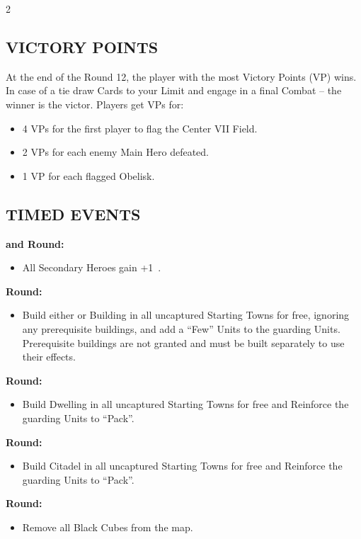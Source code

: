 \begin{multicols}{2}
\subsection*{\MakeUppercase{Victory Points}}
At the end of the Round 12, the player with the most Victory Points (VP) wins. In case of a tie draw Cards to your  Limit and engage in a final Combat -- the winner is the victor. Players get VPs for:

\begin{itemize}
  \item 4 VPs for the first player to flag the Center VII Field.
  \item 2 VPs for each enemy Main Hero defeated.
  \item 1 VP for each flagged Obelisk.
\end{itemize}

\subsection*{\MakeUppercase{Timed Events}}
\textbf{ and  Round:}
\begin{itemize}
  \item All Secondary Heroes gain +1~.
\end{itemize}
\textbf{ Round:}
\begin{itemize}
  \item Build either  or  Building in all uncaptured Starting Towns for free, ignoring any
prerequisite buildings, and add a ``Few''  Units to the guarding Units. Prerequisite buildings are not granted and must be built
separately to use their effects.
\end{itemize}
\textbf{ Round:}
\begin{itemize}
  \item Build  Dwelling in all uncaptured Starting Towns for free and Reinforce the guarding  Units to ``Pack''.
\end{itemize}
\textbf{ Round:}
\begin{itemize}
  \item Build Citadel in all uncaptured Starting Towns for free and Reinforce the guarding  Units to ``Pack''.
\end{itemize}
\textbf{ Round:}
\begin{itemize}
  \item Remove all Black Cubes from the map.
\end{itemize}


\end{multicols}
